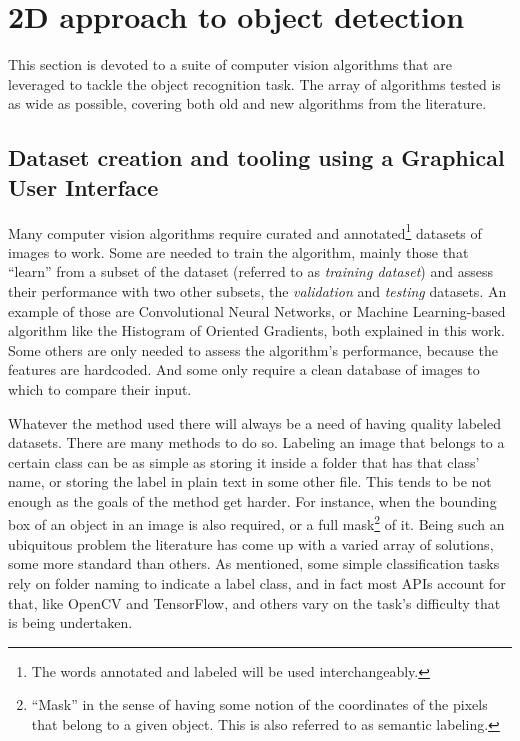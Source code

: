 \documentclass[../main.tex]{subfiles}
\begin{document}
\section{2D approach to object detection} \label{sec:2D_approach}
This section is devoted to a suite of computer vision algorithms that are leveraged to tackle the object recognition task. The array of algorithms tested is as wide as possible, covering both old and new algorithms from the literature.


\subsection{Dataset creation and tooling using a Graphical User Interface} \label{sec:GUI}
Many computer vision algorithms require curated and annotated\footnote{The words annotated and labeled will be used interchangeably.} datasets of images to work. Some are needed to train the algorithm, mainly those that ``learn'' from a subset of the dataset (referred to as \emph{training dataset}) and assess their performance with two other subsets, the \emph{validation} and \emph{testing} datasets. An example of those are Convolutional Neural Networks, or Machine Learning-based algorithm like the Histogram of Oriented Gradients, both explained in this work. Some others are only needed to assess the algorithm's performance, because the features are hardcoded. And some only require a clean database of images to which to compare their input.

Whatever the method used there will always be a need of having quality labeled datasets. There are many methods to do so. Labeling an image that belongs to a certain class can be as simple as storing it inside a folder that has that class' name, or storing the label in plain text in some other file. This tends to be not enough as the goals of the method get harder. For instance, when the bounding box of an object in an image is also required, or a full mask\footnote{``Mask'' in the sense of having some notion of the coordinates of the pixels that belong to a given object. This is also referred to as semantic labeling.} of it. Being such an ubiquitous problem the literature has come up with a varied array of solutions, some more standard than others. As mentioned, some simple classification tasks rely on folder naming to indicate a label class, and in fact most APIs account for that, like OpenCV and TensorFlow, and others vary on the task's difficulty that is being undertaken. 
\end{document}
